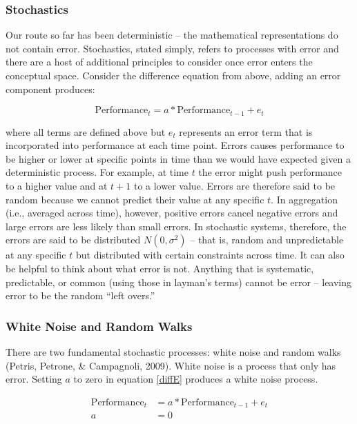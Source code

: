 \documentclass[english,,man]{apa6}
\begin{document}
\hypertarget{stochastics}{%
\subsubsection{Stochastics}\label{stochastics}}

Our route so far has been deterministic -- the mathematical representations do not contain error. Stochastics, stated simply, refers to processes with error and there are a host of additional principles to consider once error enters the conceptual space. Consider the difference equation from above, adding an error component produces:

\begin{equation}
\label{diffE}
\textrm{Performance}_{t} = a * \textrm{Performance}_{t-1} + e_{t}
\end{equation}

\noindent where all terms are defined above but \(e_{t}\) represents an error term that is incorporated into performance at each time point. Errors causes performance to be higher or lower at specific points in time than we would have expected given a deterministic process. For example, at time \(t\) the error might push performance to a higher value and at \(t+1\) to a lower value. Errors are therefore said to be random because we cannot predict their value at any specific \(t\). In aggregation (i.e., averaged across time), however, positive errors cancel negative errors and large errors are less likely than small errors. In stochastic systems, therefore, the errors are said to be distributed \(N(0, \sigma^2)\) -- that is, random and unpredictable at any specific \(t\) but distributed with certain constraints across time. It can also be helpful to think about what error is not. Anything that is systematic, predictable, or common (using those in layman's terms) cannot be error -- leaving error to be the random \enquote{left overs.}

\hypertarget{white-noise-and-random-walks}{%
\subsubsection{White Noise and Random Walks}\label{white-noise-and-random-walks}}

There are two fundamental stochastic processes: white noise and random walks (Petris, Petrone, \& Campagnoli, 2009). White noise is a process that only has error. Setting \(a\) to zero in equation \ref{diffE} produces a white noise process.

\begin{equation}
\begin{split}
\label{whitenoise}
\textrm{Performance}_{t} &= a * \textrm{Performance}_{t-1} + e_{t} \\
a &= 0
\end{split}
\end{equation}
\end{document}
